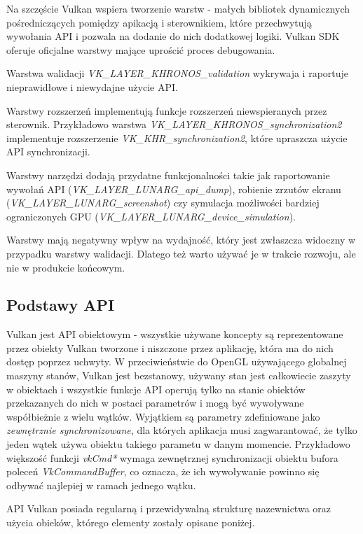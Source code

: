 Na szczęście Vulkan wspiera tworzenie warstw - małych bibliotek dynamicznych pośredniczących pomiędzy apikacją i sterownikiem, które przechwytują wywołania API i pozwala na dodanie do nich dodatkowej logiki.
Vulkan SDK oferuje oficjalne warstwy mające uprościć proces debugowania.

Warstwa walidacji \textit{VK\_LAYER\_KHRONOS\_validation} wykrywaja i raportuje nieprawidłowe i niewydajne użycie API.

Warstwy rozszerzeń implementują funkcje rozszerzeń niewspieranych przez sterownik. Przykładowo warstwa \textit{VK\_LAYER\_KHRONOS\_synchronization2} implementuje rozszerzenie \textit{VK\_KHR\_synchronization2}, które upraszcza użycie API synchronizacji.

Warstwy narzędzi dodają przydatne funkcjonalności takie jak raportowanie wywołań API (\textit{VK\_LAYER\_LUNARG\_api\_dump}), robienie zrzutów ekranu (\textit{VK\_LAYER\_LUNARG\_screenshot}) czy symulacja możliwości bardziej ograniczonych GPU (\textit{VK\_LAYER\_LUNARG\_device\_simulation}).

Warstwy mają negatywny wpływ na wydajność, który jest zwłaszcza widoczny w przypadku warstwy walidacji. Dlatego też warto używać je w trakcie rozwoju, ale nie w produkcie końcowym.

\subsection{Podstawy API}

Vulkan jest API obiektowym - wszystkie używane koncepty są reprezentowane przez obiekty Vulkan tworzone i niszczone przez aplikację, która ma do nich dostęp poprzez uchwyty.
W przeciwieństwie do OpenGL używającego globalnej maszyny stanów, Vulkan jest bezstanowy, używany stan jest całkowiecie zaszyty w obiektach i wszystkie funkcje API operują tylko na stanie obiektów przekazanych do nich w postaci parametrów i mogą być wywoływane współbieżnie z wielu wątków.
Wyjątkiem są parametry zdefiniowane jako \textit{zewnętrznie synchronizowane}, dla których aplikacja musi zagwarantować, że tylko jeden wątek używa obiektu takiego parametu w danym momencie.
Przykładowo większość funkcji \textit{vkCmd*} wymaga zewnętrznej synchronizacji obiektu bufora poleceń \textit{VkCommandBuffer}, co oznacza, że ich wywoływanie powinno się odbywać najlepiej w ramach jednego wątku.

API Vulkan posiada regularną i przewidywalną strukturę nazewnictwa oraz użycia obieków, którego elementy zostały opisane poniżej.

